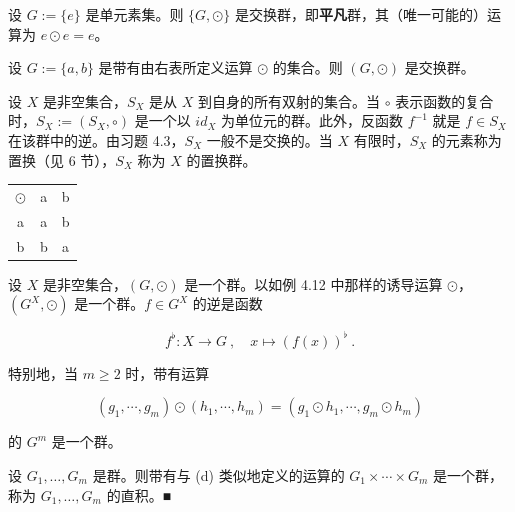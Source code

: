 \begin{example}

\begin{items}
\item

设 $G := \{e\}$ 是单元素集。则 $\{G, \odot\}$ 是交换群，即\textbf{平凡}群，其（唯一可能的）运算为 $e \odot e = e$。

\item

设 $G := \{a, b\}$ 是带有由右表所定义运算 $\odot$ 的集合。则 $(G, \odot)$ 是交换群。

\item

设 $X$ 是非空集合，$S_X$ 是从 $X$ 到自身的所有双射的集合。当 $\circ$ 表示函数的复合时，$S_X := (S_X, \circ)$ 是一个以 $id_X$ 为单位元的群。此外，反函数 $f^{-1}$ 就是 $f \in S_X$ 在该群中的逆。由习题 4.3，$S_X$ 一般不是交换的。当 $X$ 有限时，$S_X$ 的元素称为置换（见 6 节），$S_X$ 称为 $X$ 的置换群。

\end{items}

\begin{center}
\begin{tabular}{ccc}
\toprule
$ \odot $ & a & b \\
a & a & b \\
b & b & a \\
\bottomrule
\end{tabular}
\end{center}

\begin{items}
\item[（d）]

设 $X$ 是非空集合，$(G, \odot)$ 是一个群。以如例 4.12 中那样的诱导运算 $\odot$，$(G^X, \odot)$ 是一个群。$f \in G^X$ 的逆是函数

\[
f^{\flat}\colon X\to G~,\quad x\mapsto\left(f(x)\right)^{\flat}~.
\]

特别地，当 $ m \geq 2 $ 时，带有运算

\[
(g_{1},\cdots,g_{m})\odot(h_{1},\cdots,h_{m})=(g_{1}\odot h_{1},\cdots,g_{m}\odot h_{m})
\]

的 $ G^m $ 是一个群。

\item[（e）]

设 $ G_1, \ldots, G_m $ 是群。则带有与 (d) 类似地定义的运算的 $ G_1 \times \cdots \times G_m $ 是一个群，称为 $ G_1, \ldots, G_m $ 的直积。■

\end{items}

\end{example}

